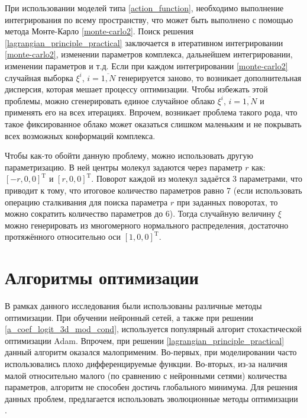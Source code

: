 При использовании моделей типа \ref{action_function}, необходимо выполнение интегрирования по всему пространству, что может быть выполнено с помощью метода Монте-Карло \ref{monte-carlo2}. Поиск решения \ref{lagrangian_principle_practical} заключается в итеративном интегрировании \ref{monte-carlo2}, изменении параметров комплекса, дальнейшем интегрировании, изменении параметров и т.д. Если при каждом интегрировании \ref{monte-carlo2} случайная выборка $\xi^i$, $i=\overline{1,N}$ генерируется заново, то возникает дополнительная дисперсия, которая мешает процессу оптимизации. Чтобы избежать этой проблемы, можно сгенерировать единое случайное облако $\xi^i$, $i=\overline{1,N}$ и применять его на всех итерациях. Впрочем, возникает проблема такого рода, что такое фиксированное облако может оказаться слишком маленьким и не покрывать всех возможных конформаций комплекса.

Чтобы как-то обойти данную проблему, можно использовать другую параметризацию. В ней центры молекул задаются через параметр $r$ как: $[-r, 0, 0]^\mathrm{T}$ и $[r, 0, 0]^\mathrm{T}$. Поворот каждой из молекул задаётся 3 параметрами, что приводит к тому, что итоговое количество параметров равно 7 (если использовать операцию сталкивания для поиска параметра $r$ при заданных поворотах, то можно сократить количество параметров до 6). Тогда случайную величину $\xi$ можно генерировать из многомерного нормального распределения, достаточно протяжённого относительно оси $[1, 0, 0]^\mathrm{T}$.

\section{Алгоритмы оптимизации}
В рамках данного исследования были использованы различные методы оптимизации. При обучении нейронный сетей, а также при решении \ref{a_coef_logit_3d_mod_cond}, используется популярный алгорит стохастической оптимизации Adam\cite{adam}. Впрочем, при решении \ref{lagrangian_principle_practical} данный алгоритм оказался малоприменим. Во-первых, при моделировании часто использовались плохо дифференцируемые функции. Во-вторых, из-за наличия малой относительно малого (по сравнению с нейронными сетями) количества параметров, алгоритм не способен достичь глобального минимума. Для решения данных проблем, предлагается использовать эволюционные методы оптимизации \cite{evol_methods}.

